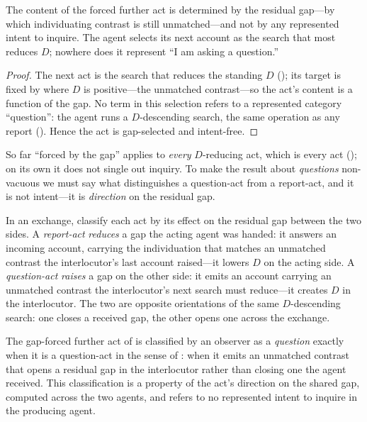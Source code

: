\documentclass[11pt,twocolumn,a4paper]{article}
\newcommand{\dem}{D}
\begin{document}
\begin{theorem}
\label{thm:gapselects}
The content of the forced further act is determined by the residual gap---by
which individuating contrast is still unmatched---and not by any represented
intent to inquire. The agent selects its next account as the search that
most reduces $\dem$; nowhere does it represent ``I am asking a question.''
\end{theorem}

\begin{proof}
The next act is the search that reduces the standing $\dem$
(); its target is fixed by where $\dem$ is
positive---the unmatched contrast---so the act's content is a function of the
gap. No term in this selection refers to a represented category ``question'':
the agent runs a $\dem$-descending search, the same operation as any report
(). Hence the act is gap-selected and intent-free.
\end{proof}

So far ``forced by the gap'' applies to \emph{every} $\dem$-reducing act,
which is every act (); on its own it does
not single out inquiry. To make the result about \emph{questions}
non-vacuous we must say what distinguishes a question-act from a report-act,
and it is not intent---it is \emph{direction} on the residual gap.

\begin{definition}
\label{def:qdirection}
In an exchange, classify each act by its effect on the residual gap between
the two sides. A \emph{report-act} \emph{reduces} a gap the acting agent was
handed: it answers an incoming account, carrying the individuation that
matches an unmatched contrast the interlocutor's last account raised---it
lowers $\dem$ on the acting side. A \emph{question-act} \emph{raises} a gap
on the other side: it emits an account carrying an unmatched contrast the
interlocutor's next search must reduce---it creates $\dem$ in the
interlocutor. The two are opposite orientations of the same
$\dem$-descending search: one closes a received gap, the other opens one
across the exchange.
\end{definition}

\begin{theorem}
\label{thm:questionis}
The gap-forced further act of  is classified by an
observer as a \emph{question} exactly when it is a question-act in the sense
of : when it emits an unmatched contrast that opens a
residual gap in the interlocutor rather than closing one the agent received.
This classification is a property of the act's direction on the shared gap,
computed across the two agents, and refers to no represented intent to
inquire in the producing agent.
\end{theorem}
\end{document}
